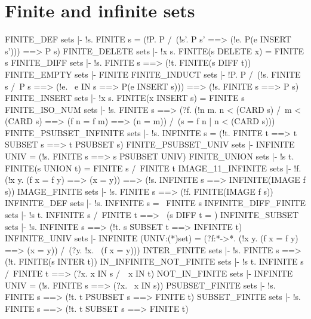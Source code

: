 \section{Finite and infinite sets}
\THEOREM FINITE\_DEF sets
|- !s.
    FINITE s = (!P. P{} /\ (!s'. P s' ==> (!e. P(e INSERT s'))) ==> P s)
\ENDTHEOREM
\THEOREM FINITE\_DELETE sets
|- !x s. FINITE(s DELETE x) = FINITE s
\ENDTHEOREM
\THEOREM FINITE\_DIFF sets
|- !s. FINITE s ==> (!t. FINITE(s DIFF t))
\ENDTHEOREM
\THEOREM FINITE\_EMPTY sets
|- FINITE{}
\ENDTHEOREM
\THEOREM FINITE\_INDUCT sets
|- !P.
    P{} /\ (!s. FINITE s /\ P s ==> (!e. ~e IN s ==> P(e INSERT s))) ==>
    (!s. FINITE s ==> P s)
\ENDTHEOREM
\THEOREM FINITE\_INSERT sets
|- !x s. FINITE(x INSERT s) = FINITE s
\ENDTHEOREM
\THEOREM FINITE\_ISO\_NUM sets
|- !s.
    FINITE s ==>
    (?f.
      (!n m. n < (CARD s) /\ m < (CARD s) ==> (f n = f m) ==> (n = m)) /\
      (s = {f n | n < (CARD s)}))
\ENDTHEOREM
\THEOREM FINITE\_PSUBSET\_INFINITE sets
|- !s. INFINITE s = (!t. FINITE t ==> t SUBSET s ==> t PSUBSET s)
\ENDTHEOREM
\THEOREM FINITE\_PSUBSET\_UNIV sets
|- INFINITE UNIV = (!s. FINITE s ==> s PSUBSET UNIV)
\ENDTHEOREM
\THEOREM FINITE\_UNION sets
|- !s t. FINITE(s UNION t) = FINITE s /\ FINITE t
\ENDTHEOREM
\THEOREM IMAGE\_11\_INFINITE sets
|- !f.
    (!x y. (f x = f y) ==> (x = y)) ==>
    (!s. INFINITE s ==> INFINITE(IMAGE f s))
\ENDTHEOREM
\THEOREM IMAGE\_FINITE sets
|- !s. FINITE s ==> (!f. FINITE(IMAGE f s))
\ENDTHEOREM
\THEOREM INFINITE\_DEF sets
|- !s. INFINITE s = ~FINITE s
\ENDTHEOREM
\THEOREM INFINITE\_DIFF\_FINITE sets
|- !s t. INFINITE s /\ FINITE t ==> ~(s DIFF t = {})
\ENDTHEOREM
\THEOREM INFINITE\_SUBSET sets
|- !s. INFINITE s ==> (!t. s SUBSET t ==> INFINITE t)
\ENDTHEOREM
\THEOREM INFINITE\_UNIV sets
|- INFINITE (UNIV:(*)set) =
   (?f:*->*. (!x y. (f x = f y) ==> (x = y)) /\ (?y. !x. ~(f x = y)))
\ENDTHEOREM
\THEOREM INTER\_FINITE sets
|- !s. FINITE s ==> (!t. FINITE(s INTER t))
\ENDTHEOREM
\THEOREM IN\_INFINITE\_NOT\_FINITE sets
|- !s t. INFINITE s /\ FINITE t ==> (?x. x IN s /\ ~x IN t)
\ENDTHEOREM
\THEOREM NOT\_IN\_FINITE sets
|- INFINITE UNIV = (!s. FINITE s ==> (?x. ~x IN s))
\ENDTHEOREM
\THEOREM PSUBSET\_FINITE sets
|- !s. FINITE s ==> (!t. t PSUBSET s ==> FINITE t)
\ENDTHEOREM
\THEOREM SUBSET\_FINITE sets
|- !s. FINITE s ==> (!t. t SUBSET s ==> FINITE t)
\ENDTHEOREM

